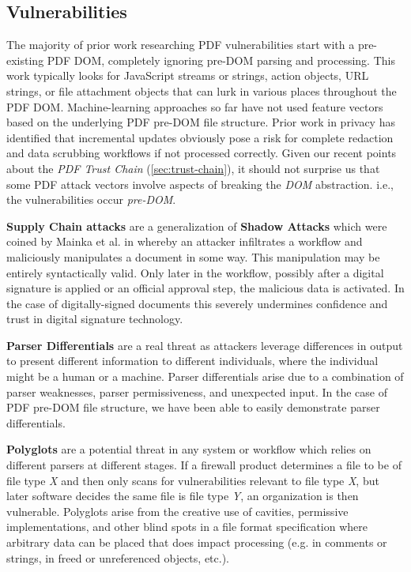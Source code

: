 \subsection{Vulnerabilities}
\label{sec:vulnerabilities}


The majority of prior work researching PDF vulnerabilities start with a pre-existing PDF DOM,
completely ignoring pre-DOM parsing and processing.  This work typically looks for
JavaScript streams or strings, action objects, URL strings, or file attachment objects that 
can lurk in various places throughout the PDF DOM. Machine-learning approaches so far have not  
used feature vectors based on the underlying PDF pre-DOM file structure. 
Prior work in privacy has identified that incremental updates obviously pose a risk for complete
redaction and data scrubbing workflows if not processed correctly.
Given our recent points about the \emph{PDF Trust Chain} (\cref{sec:trust-chain}), it should not 
surprise us that some PDF attack vectors involve aspects of breaking the \emph{DOM} abstraction.
i.e., the vulnerabilities occur \emph{pre-DOM}.

{\bf{Supply Chain attacks}} are a generalization of {\bf{Shadow Attacks}} which were coined by Mainka 
et al. in \cite{mainkaShadowAttacksHiding2021} whereby an attacker infiltrates a workflow and 
maliciously manipulates a document in some way. This manipulation may be entirely syntactically valid.
Only later in the workflow, possibly after a 
digital signature is applied or an official approval step, the malicious data is 
activated. In the case of digitally-signed documents this severely undermines confidence and trust
in digital signature technology.

{\bf{Parser Differentials}} are a real threat as attackers leverage differences in output
to present different information to different individuals, where the individual might be a human
or a machine. Parser differentials arise due to a combination of parser weaknesses, 
parser permissiveness, and unexpected input. In the case of PDF pre-DOM file structure, we have been
able to easily demonstrate parser differentials.

{\bf{Polyglots}} are a potential threat in any system or workflow which relies on different parsers
at different stages. If a firewall product determines a file to be of file type \emph{X} and then only 
scans for vulnerabilities relevant to file type \emph{X}, but later software decides the same file 
is file type \emph{Y}, an organization is then vulnerable. Polyglots arise from the creative use of
cavities, permissive implementations, 
and other blind spots in a file format specification where arbitrary data can be placed 
that does impact processing (e.g. in comments or strings, in freed or unreferenced objects, etc.).

